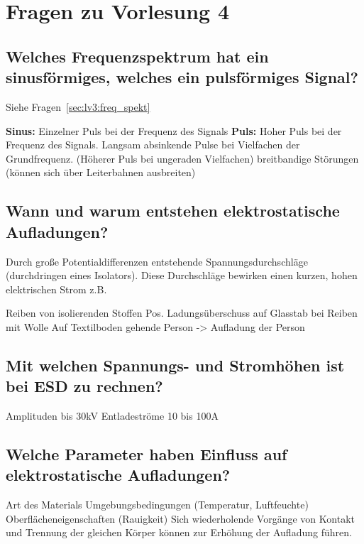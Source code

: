 \section{Fragen zu Vorlesung 4}

\subsection{Welches Frequenzspektrum hat ein sinusförmiges, welches ein pulsförmiges Signal?}
Siehe Fragen~\ref{sec:lv3:freq_spekt}
\begin{outline}
  \1 \textbf{Sinus:} Einzelner Puls bei der Frequenz des Signals
  \1 \textbf{Puls:} Hoher Puls bei der Frequenz des Signals. Langsam absinkende Pulse bei Vielfachen der Grundfrequenz. (Höherer Puls bei ungeraden Vielfachen)
  breitbandige Störungen (können sich über Leiterbahnen ausbreiten)
\end{outline}

\subsection{Wann und warum entstehen elektrostatische Aufladungen?}\label{sec:lv4:electrostatic}
Durch große Potentialdifferenzen entstehende Spannungsdurchschläge (durchdringen eines Isolators). Diese Durchschläge bewirken einen kurzen, hohen elektrischen Strom\p
z.B.
\begin{outline}
  \1 Reiben von isolierenden Stoffen
  \1 Pos. Ladungsüberschuss auf Glasstab bei Reiben mit Wolle
  \1 Auf Textilboden gehende Person -> Aufladung der Person
\end{outline}

\subsection{Mit welchen Spannungs- und Stromhöhen ist bei ESD zu rechnen?}
\begin{outline}
  \1 Amplituden bis 30kV
  \1 Entladeströme 10 bis 100A
\end{outline}

\subsection{Welche Parameter haben Einfluss auf elektrostatische Aufladungen?}
\begin{outline}
  \1 Art des Materials
  \1 Umgebungsbedingungen (Temperatur, Luftfeuchte)
  \1 Oberflächeneigenschaften (Rauigkeit)
  \1 Sich wiederholende Vorgänge von Kontakt und Trennung der gleichen Körper können zur Erhöhung der Aufladung führen.
\end {outline}

